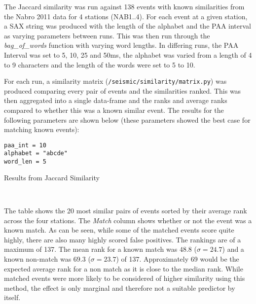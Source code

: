 \documentclass[../report.tex]{subfiles}
\begin{document}
	The Jaccard similarity was run against 138 events with known similarities from the Nabro 2011 data for 4 stations (NAB1..4).  For each event at a given station, a SAX string was produced with the length of the alphabet and the PAA interval as varying parameters between runs.  This was then run through the \textit{bag\_of\_words} function with varying word lengths.  In differing runs, the PAA Interval was set to 5, 10, 25 and 50ms, the alphabet was varied from a length of 4 to 9 characters and the length of the words were set to 5 to 10.
	
	For each run, a similarity matrix (\texttt{/seismic/similarity/matrix.py}) was produced comparing every pair of events and the similarities ranked.  This was then aggregated into a single data-frame and the ranks and average ranks compared to whether this was a known similar event.  The results for the following parameters are shown below (these parameters showed the best case for matching known events):
	
\begin{verbatim}
paa_int = 10
alphabet = "abcde"
word_len = 5
\end{verbatim}

\begin{table}[H]
	\caption{Results from Jaccard Similarity}
	\\
\end{table}

	The table shows the 20 most similar pairs of events sorted by their average rank across the four stations.  The \textit{Match} column shows whether or not the event was a known match.  As can be seen, while some of the matched events score quite highly, there are also many highly scored false positives.  The rankings are of a maximum of 137.  The mean rank for a known match was $48.8$ ($\sigma = 24.7$) and a known non-match was $69.3$ ($\sigma = 23.7$) of 137.  Approximately 69 would be the expected average rank for a non match as it is close to the median rank.  While matched events were more likely to be considered of higher similarity using this method, the effect is only marginal and therefore not a suitable predictor by itself.
\end{document}
